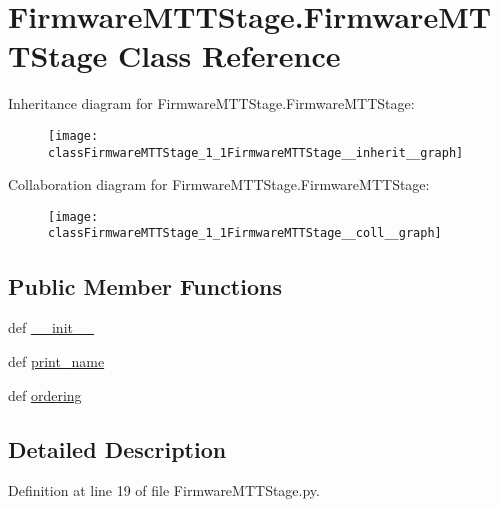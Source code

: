 \hypertarget{classFirmwareMTTStage_1_1FirmwareMTTStage}{\section{Firmware\-M\-T\-T\-Stage.\-Firmware\-M\-T\-T\-Stage Class Reference}
\label{classFirmwareMTTStage_1_1FirmwareMTTStage}
}


Inheritance diagram for Firmware\-M\-T\-T\-Stage.\-Firmware\-M\-T\-T\-Stage\-:\nopagebreak
\begin{figure}[H]
\begin{center}
\leavevmode
\texttt{[image: classFirmwareMTTStage\_1\_1FirmwareMTTStage\_\_inherit\_\_graph]}
\end{center}
\end{figure}


Collaboration diagram for Firmware\-M\-T\-T\-Stage.\-Firmware\-M\-T\-T\-Stage\-:\nopagebreak
\begin{figure}[H]
\begin{center}
\leavevmode
\texttt{[image: classFirmwareMTTStage\_1\_1FirmwareMTTStage\_\_coll\_\_graph]}
\end{center}
\end{figure}
\subsection*{Public Member Functions}
\begin{DoxyCompactItemize}
\item 
def \hyperlink{classFirmwareMTTStage_1_1FirmwareMTTStage_ac41e353c612f975f877e4d2788a3a15a}{\-\_\-\-\_\-init\-\_\-\-\_\-}
\item 
def \hyperlink{classFirmwareMTTStage_1_1FirmwareMTTStage_a32aacb4097082f6fd437d98698403342}{print\-\_\-name}
\item 
def \hyperlink{classFirmwareMTTStage_1_1FirmwareMTTStage_a6a671924e976460a0efc3a2d211c064b}{ordering}
\end{DoxyCompactItemize}


\subsection{Detailed Description}


Definition at line 19 of file Firmware\-M\-T\-T\-Stage.\-py.



